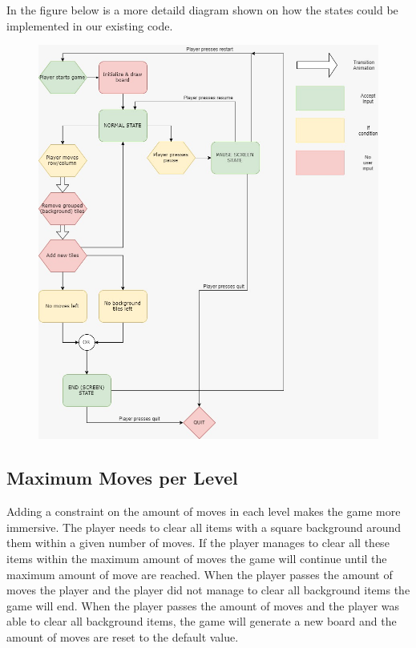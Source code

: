\documentclass{article}
\begin{document}
In the figure below is a more detaild diagram shown on how the states could be implemented in our existing code.
\begin{figure}[H]
\includegraphics[scale=0.45]{Images/GameStates.jpeg}
\end{figure}


\subsection{Maximum Moves per Level}
Adding a constraint on the amount of moves in each level makes the game more immersive. The player needs to clear all items with a square background around them within a given number of moves. If the player manages to clear all these items within the maximum amount of moves the game will continue until the maximum amount of move are reached. When the player passes the amount of moves the player and the player did not manage to clear all background items the game will end. When the player passes the amount of moves and the player was able to clear all background items, the game will generate a new board and the amount of moves are reset to the default value. 
\end{document}
